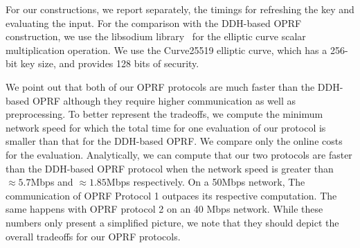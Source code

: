 For our constructions, we report separately, the timings for refreshing the key and evaluating the input. For the comparison with the DDH-based OPRF construction, we use the libsodium library~\cite{LibSodium} for the elliptic curve scalar multiplication operation. We use the Curve25519 elliptic curve, which has a 256-bit key size, and provides 128 bits of security. 

We point out that both of our OPRF protocols are much faster than the DDH-based OPRF although they require higher communication as well as preprocessing. To better represent the tradeoffs, we compute the minimum network speed for which the total time for one evaluation of our protocol is smaller than that for the DDH-based OPRF. We compare only the online costs for the evaluation. Analytically, we can compute that our two protocols are faster than the DDH-based OPRF protocol when the network speed is greater than $\approx 5.7$Mbps and $\approx 1.85$Mbps respectively. On a 50Mbps network, The communication of OPRF Protocol 1 outpaces its respective computation. The same happens with OPRF protocol 2 on an 40 Mbps network. While these numbers only present a simplified picture, we note that they should depict the overall tradeoffs for our OPRF protocols.



